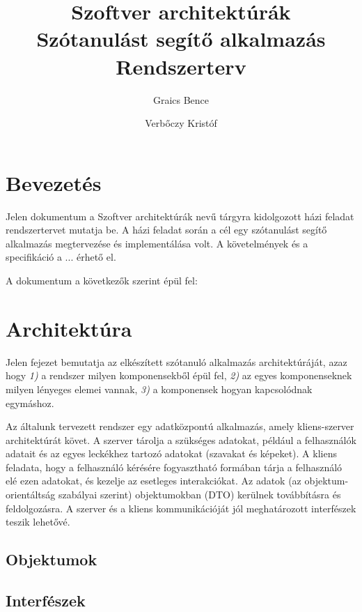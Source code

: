 \documentclass[11pt, a4paper]{article}
\begin{document}
\title{Szoftver architektúrák \\ Szótanulást segítő alkalmazás \\ \large{Rendszerterv}}
    \author{Graics Bence \and Verbőczy Kristóf}

    \maketitle
    
    \tableofcontents
    \newpage
    
    \section{Bevezetés}
    \label{sec:bevezetes}
    Jelen dokumentum a Szoftver architektúrák nevű tárgyra kidolgozott házi feladat rendszertervet mutatja be. A házi feladat során a cél egy szótanulást segítő alkalmazás megtervezése és implementálása volt. A követelmények és a specifikáció a ... érhető el.
    
    A dokumentum a következők szerint épül fel:
    
    \section{Architektúra}
    \label{sec:architektúra}
    Jelen fejezet bemutatja az elkészített szótanuló alkalmazás architektúráját, azaz hogy \textit{1)} a rendszer milyen komponensekből épül fel, \textit{2)} az egyes komponenseknek milyen lényeges elemei vannak, \textit{3)} a komponensek hogyan kapcsolódnak egymáshoz.
    
    Az általunk tervezett rendszer egy adatközpontú alkalmazás, amely kliens-szerver architektúrát követ. A szerver tárolja a szükséges adatokat, például a felhasználók adatait és az egyes leckékhez tartozó adatokat (szavakat és képeket). A kliens feladata, hogy a felhasználó kérésére fogyasztható formában tárja a felhasználó elé ezen adatokat, és kezelje az esetleges interakciókat. Az adatok (az objektum-orientáltság szabályai szerint) objektumokban (DTO) kerülnek továbbításra és feldolgozásra. A szerver és a kliens kommunikációját jól meghatározott interfészek teszik lehetővé.
    
    \subsection{Objektumok}
    
    \subsection{Interfészek}
    
\end{document}
